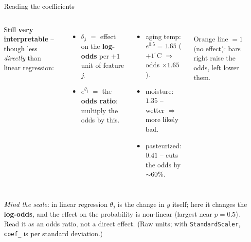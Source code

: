 \documentclass[aspectratio=169]{beamer}
\begin{document}
\begin{frame}{Reading the coefficients}
  \begin{columns}[T]
    Still \textbf{very interpretable} -- though less \emph{directly} than linear
    regression:
    \begin{itemize}\small
      \item $\theta_j$ $=$ effect on the \textbf{log-odds} per $+1$ unit of feature $j$.
      \item $e^{\theta_j}$ $=$ the \textbf{odds ratio}: multiply the odds by this.
    \end{itemize}
    \vskip 4pt
    \begin{itemize}\footnotesize
      \item aging temp: $e^{0.5}=1.65$ ($+1^\circ$C $\Rightarrow$ odds $\times 1.65$).
      \item moisture: $1.35$ -- wetter $\Rightarrow$ more likely bad.
      \item pasteurized: $0.41$ -- cuts the odds by $\sim 60\%$.
    \end{itemize}
    \begin{center}
      \\[-2pt]
      \scriptsize Orange line $=1$ (no effect): bars right raise the odds, left lower them.
    \end{center}
  \end{columns}
  \vskip 2pt
  \footnotesize \emph{Mind the scale:} in linear regression $\theta_j$ is the change in
  $y$ itself; here it changes the \textbf{log-odds}, and the effect on the probability is
  non-linear (largest near $p=0.5$). Read it as an odds ratio, not a direct effect.
  (Raw units; with \texttt{StandardScaler}, \texttt{coef\_} is per standard deviation.)
\end{frame}
\end{document}
